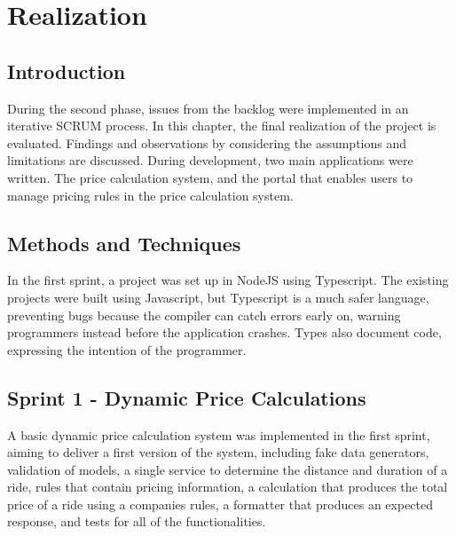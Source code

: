 \graphicspath{{Chapter6/Figs/Vector/}{Chapter6/Figs/}}

%
\chapter{Realization}
\section{Introduction}
During the second phase, issues from the backlog were implemented in an iterative SCRUM process. In this chapter, the final realization of the project is evaluated. Findings and observations by considering the assumptions and limitations are discussed. During development, two main applications were written. The price calculation system, and the portal that enables users to manage pricing rules in the price calculation system.

%
\section{Methods and Techniques}
In the first sprint, a project was set up in NodeJS using Typescript. The existing projects were built using Javascript, but Typescript is a much safer language, preventing bugs because the compiler can catch errors early on, warning programmers instead before the application crashes. Types also document code, expressing the intention of the programmer.

%
\section{Sprint 1 - Dynamic Price Calculations}
A basic dynamic price calculation system was implemented in the first sprint, aiming to deliver a first version of the system, including fake data generators, validation of models, a single service to determine the distance and duration of a ride, rules that contain pricing information, a calculation that produces the total price of a ride using a companies rules, a formatter that produces an expected response, and tests for all of the functionalities.

